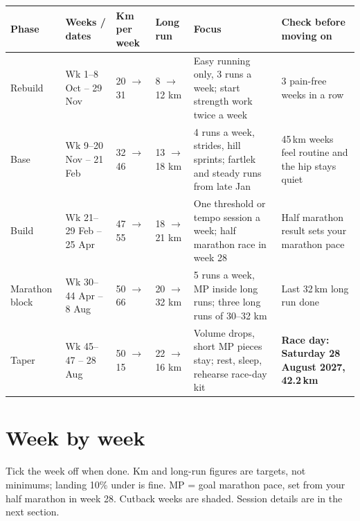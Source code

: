 \documentclass[11pt,a4paper]{article}
\begin{document}
{\small
\setlength{\tabcolsep}{4pt}
\begin{center}
\begin{tabular}{@{}L{1.7cm}L{2.5cm}L{1.6cm}L{1.6cm}L{4.0cm}L{3.7cm}@{}}
\toprule
\textbf{Phase} & \textbf{Weeks / dates} & \textbf{Km per week} & \textbf{Long run} & \textbf{Focus} & \textbf{Check before moving on} \\
\midrule
Rebuild & Wk 1--8  Oct -- 29 Nov & 20 $\rightarrow$ 31 & 8 $\rightarrow$ 12 km & Easy running only, 3 runs a week; start strength work twice a week & 3 pain-free weeks in a row \\
\addlinespace
Base & Wk 9--20  Nov -- 21 Feb & 32 $\rightarrow$ 46 & 13 $\rightarrow$ 18 km & 4 runs a week, strides, hill sprints; fartlek and steady runs from late Jan & 45\,km weeks feel routine and the hip stays quiet \\
\addlinespace
Build & Wk 21--29  Feb -- 25 Apr & 47 $\rightarrow$ 55 & 18 $\rightarrow$ 21 km & One threshold or tempo session a week; half marathon race in week 28 & Half marathon result sets your marathon pace \\
\addlinespace
Marathon block & Wk 30--44  Apr -- 8 Aug & 50 $\rightarrow$ 66 & 20 $\rightarrow$ 32 km & 5 runs a week, MP inside long runs; three long runs of 30--32 km & Last 32\,km long run done \\
\addlinespace
Taper & Wk 45--47  -- 28 Aug & 50 $\rightarrow$ 15 & 22 $\rightarrow$ 16 km & Volume drops, short MP pieces stay; rest, sleep, rehearse race-day kit & \textbf{Race day: Saturday 28 August 2027, 42.2\,km} \\
\bottomrule
\end{tabular}
\end{center}
}

\section*{Week by week}

Tick the week off when done. Km and long-run figures are targets, not minimums; landing 10\% under is fine. MP = goal marathon pace, set from your half marathon in week 28. Cutback weeks are shaded. Session details are in the next section.
\end{document}
